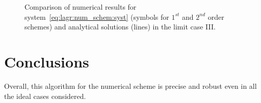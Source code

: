 \begin{figure}[H]
  \centering
  \caption{Comparison of numerical results for system~\ref{eq:lagr:num_schem:syst} (symbols for $1^{st}$ and $2^{nd}$ order schemes) and analytical solutions (lines) in the limit case III.}
  \label{Fig_NUM_SCHEME_LIMIT_CASE_III}
\end{figure}


\section{Conclusions}
Overall, this algorithm for the numerical scheme is precise and robust even in all the ideal cases considered.

\clearpage


